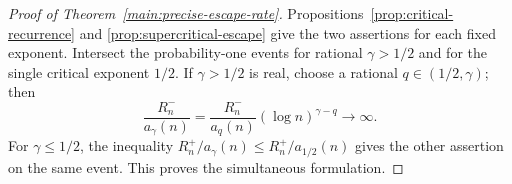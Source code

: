 \begin{proof}[Proof of Theorem~\ref{main:precise-escape-rate}]
Propositions~\ref{prop:critical-recurrence} and
\ref{prop:supercritical-escape} give the two assertions for each fixed
exponent. Intersect the probability-one events for rational
$\gamma>1/2$ and for the single critical exponent $1/2$.
If $\gamma>1/2$ is real, choose a rational $q\in(1/2,\gamma)$; then
\[
 \frac{R_n^-}{a_\gamma(n)}
 =\frac{R_n^-}{a_q(n)}(\log n)^{\gamma-q}\longrightarrow\infty.
\]
For $\gamma\le1/2$, the inequality
$R_n^+/a_\gamma(n)\le R_n^+/a_{1/2}(n)$ gives the other assertion on the
same event. This proves the simultaneous formulation.
\end{proof}
